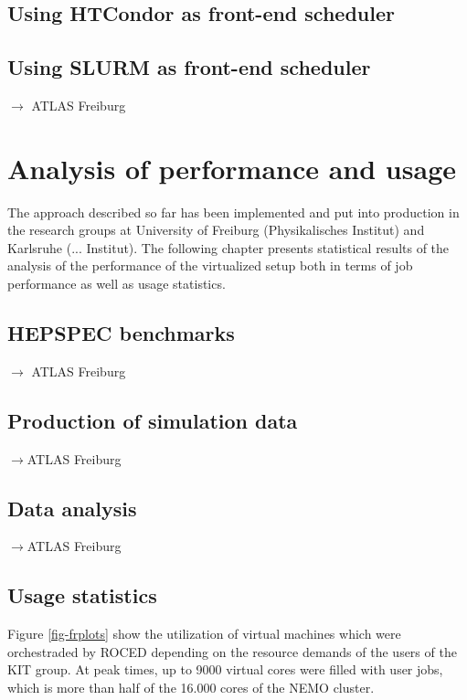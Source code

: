 \subsection{Using HTCondor as front-end scheduler}\label{sec:ROCED:HTCondor}


\subsection{Using SLURM as front-end scheduler}
$\to$ ATLAS Freiburg\\



\section{Analysis of performance and usage}

The approach described so far has been implemented and put into
production in the research groups at University of Freiburg
(Physikalisches Institut) and Karlsruhe (... Institut).
The following chapter presents statistical results of the analysis of
the performance of the virtualized setup both in terms of job
performance as well as usage statistics.


\subsection{HEPSPEC benchmarks}
$\to$ ATLAS Freiburg\\




\subsection{Production of simulation data}
$\to$ATLAS Freiburg
\\

\subsection{Data analysis}
$\to$ATLAS Freiburg 

\subsection{Usage statistics}
Figure \ref{fig-frplots} show the utilization of virtual machines which were orchestraded by ROCED depending on the resource demands of the users of the KIT group. At peak times, up to 9000 virtual cores were filled with user jobs, which is more than half of the 16.000 cores of the NEMO cluster. 

